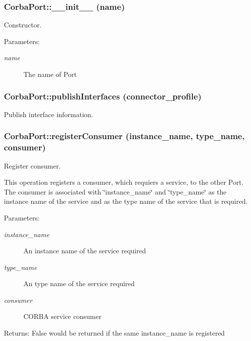 \subsubsection{\setlength{\rightskip}{0pt plus 5cm}Corba\-Port::\_\-\_\-init\_\-\_\- (name)}\label{classCorbaPort_CorbaPorta0}


Constructor. 

\begin{Desc}
\item[Parameters:]
\begin{description}
\item[{\em name}]The name of Port\end{description}
\end{Desc}
\subsubsection{\setlength{\rightskip}{0pt plus 5cm}Corba\-Port::publish\-Interfaces (connector\_\-profile)}\label{classCorbaPort_CorbaPorta4}


Publish interface information. 

\subsubsection{\setlength{\rightskip}{0pt plus 5cm}Corba\-Port::register\-Consumer (instance\_\-name, type\_\-name, consumer)}\label{classCorbaPort_CorbaPorta3}


Register consumer. 

This operation registers a consumer, which requiers a service, to the other Port. The consumer is associated with \char`\"{}instance\_\-name\char`\"{} and \char`\"{}type\_\-name\char`\"{} as the instance name of the service and as the type name of the service that is required. \begin{Desc}
\item[Parameters:]
\begin{description}
\item[{\em instance\_\-name}]An instance name of the service required \item[{\em type\_\-name}]An type name of the service required \item[{\em consumer}]CORBA service consumer \end{description}
\end{Desc}
\begin{Desc}
\item[Returns:]False would be returned if the same instance\_\-name is registered\end{Desc}
